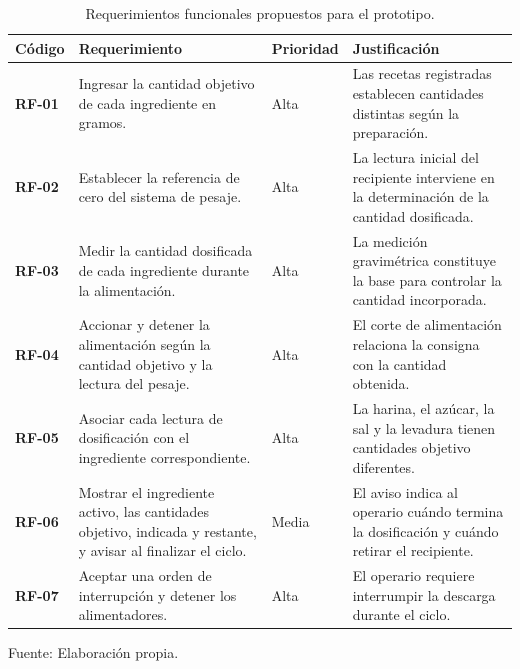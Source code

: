 \begin{table}[H]
    \centering
    \caption{Requerimientos funcionales propuestos para el prototipo.}
    \label{tab:requerimientos_funcionales_prototipo}
    \footnotesize
    \setlength{\tabcolsep}{3pt}
    \renewcommand{\arraystretch}{1.2}
    \begin{tabularx}{\textwidth}{p{}p{}p{}X}
        \toprule[1pt]
        \textbf{Código} & \textbf{Requerimiento} & \textbf{Prioridad} & \textbf{Justificación} \\
        \midrule[1pt]
        \textbf{RF-01} & Ingresar la cantidad objetivo de cada ingrediente en gramos. & Alta & Las recetas registradas establecen cantidades distintas según la preparación. \\
        \addlinespace[5pt]
        \textbf{RF-02} & Establecer la referencia de cero del sistema de pesaje. & Alta & La lectura inicial del recipiente interviene en la determinación de la cantidad dosificada. \\
        \addlinespace[5pt]
        \textbf{RF-03} & Medir la cantidad dosificada de cada ingrediente durante la alimentación. & Alta & La medición gravimétrica constituye la base para controlar la cantidad incorporada. \\
        \addlinespace[5pt]
        \textbf{RF-04} & Accionar y detener la alimentación según la cantidad objetivo y la lectura del pesaje. & Alta & El corte de alimentación relaciona la consigna con la cantidad obtenida. \\
        \addlinespace[5pt]
        \textbf{RF-05} & Asociar cada lectura de dosificación con el ingrediente correspondiente. & Alta & La harina, el azúcar, la sal y la levadura tienen cantidades objetivo diferentes. \\
        \addlinespace[5pt]
        \textbf{RF-06} & Mostrar el ingrediente activo, las cantidades objetivo, indicada y restante, y avisar al finalizar el ciclo. & Media & El aviso indica al operario cuándo termina la dosificación y cuándo retirar el recipiente. \\
        \addlinespace[5pt]
        \textbf{RF-07} & Aceptar una orden de interrupción y detener los alimentadores. & Alta & El operario requiere interrumpir la descarga durante el ciclo. \\
        \bottomrule[1pt]
    \end{tabularx}
    \vspace{2pt}
    {\footnotesize Fuente: Elaboración propia.}
\end{table}


